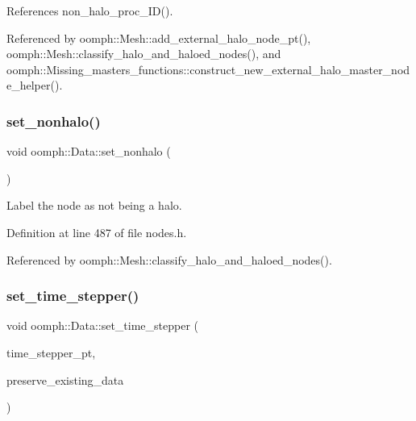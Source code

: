 References non\+\_\+halo\+\_\+proc\+\_\+\+I\+D().



Referenced by oomph\+::\+Mesh\+::add\+\_\+external\+\_\+halo\+\_\+node\+\_\+pt(), oomph\+::\+Mesh\+::classify\+\_\+halo\+\_\+and\+\_\+haloed\+\_\+nodes(), and oomph\+::\+Missing\+\_\+masters\+\_\+functions\+::construct\+\_\+new\+\_\+external\+\_\+halo\+\_\+master\+\_\+node\+\_\+helper().

\mbox{\label{classoomph_1_1Data_ab2c485e220d3cf13647d251c509f5136}} 
\subsubsection{\texorpdfstring{set\+\_\+nonhalo()}{set\_nonhalo()}}
{\footnotesize\ttfamily void oomph\+::\+Data\+::set\+\_\+nonhalo (\begin{DoxyParamCaption}{ }\end{DoxyParamCaption})\hspace{0.3cm}{\ttfamily [inline]}}



Label the node as not being a halo. 



Definition at line 487 of file nodes.\+h.



Referenced by oomph\+::\+Mesh\+::classify\+\_\+halo\+\_\+and\+\_\+haloed\+\_\+nodes().

\mbox{\label{classoomph_1_1Data_acd22fabfb127ff4ea37a5bc60c61b414}} 
\subsubsection{\texorpdfstring{set\+\_\+time\+\_\+stepper()}{set\_time\_stepper()}}
{\footnotesize\ttfamily void oomph\+::\+Data\+::set\+\_\+time\+\_\+stepper (\begin{DoxyParamCaption}\item[{\hyperlink{classoomph_1_1TimeStepper}{Time\+Stepper} $\ast$const \&}]{time\+\_\+stepper\+\_\+pt,  }\item[{const bool \&}]{preserve\+\_\+existing\+\_\+data }\end{DoxyParamCaption})}



